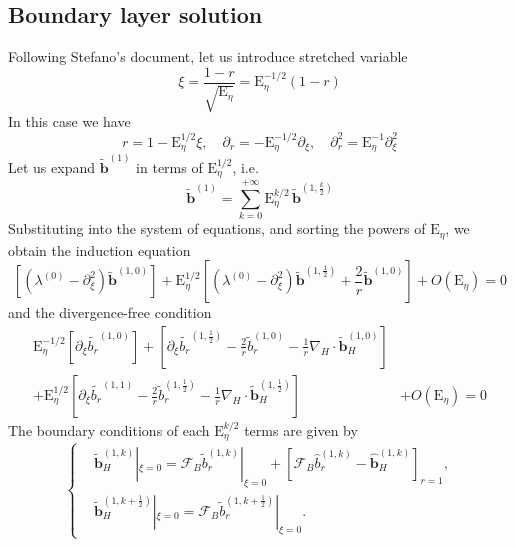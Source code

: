 \subsection{Boundary layer solution}

Following Stefano's document, let us introduce stretched variable
%
\begin{equation}
    \xi = \frac{1 - r}{\sqrt{\mathrm{E}_\eta}} = \mathrm{E}_\eta^{-1/2} (1 - r)
\end{equation}
%
In this case we have
%
\[
    r = 1 - \mathrm{E}_\eta^{1/2} \xi,\quad 
    \partial_r = - \mathrm{E}_\eta^{-1/2} \partial_\xi,\quad 
    \partial_r^2 = \mathrm{E}_\eta^{-1} \partial_\xi^2
\]
%
Let us expand $\widetilde{\mathbf{b}}^{(1)}$ in terms of $\mathrm{E}_\eta^{1/2}$, i.e. 
%
\begin{equation}
    \widetilde{\mathbf{b}}^{(1)} = \sum_{k=0}^{+\infty} \mathrm{E}_\eta^{k/2} \, \widetilde{\mathbf{b}}^{\left(1,\frac{k}{2}\right)}
\end{equation}
%
Substituting into the system of equations, and sorting the powers of $\mathrm{E}_\eta$, we obtain the induction equation
%
\begin{equation}
    \left[\left(\lambda^{(0)} - \partial_\xi^2\right) \widetilde{\mathbf{b}}^{(1,0)}\right] + \mathrm{E}_\eta^{1/2} \left[\left(\lambda^{(0)} - \partial_\xi^2\right) \widetilde{\mathbf{b}}^{(1,\frac{1}{2})} + \frac{2}{r} \widetilde{\mathbf{b}}^{(1,0)}\right] + O(\mathrm{E}_\eta) = 0
\end{equation}
%
and the divergence-free condition
%
\begin{align}
    \mathrm{E}_\eta^{-1/2} \left[\partial_\xi \widetilde{b_r}^{(1,0)}\right] + \left[\partial_\xi \widetilde{b_r}^{(1,\frac{1}{2})} - \frac{2}{r} \widetilde{b}_r^{(1,0)} - \frac{1}{r} \nabla_H\cdot \widetilde{\mathbf{b}}_H^{(1,0)}\right] & \\
    + \mathrm{E}_\eta^{1/2} \left[\partial_\xi \widetilde{b_r}^{(1,1)} - \frac{2}{r} \widetilde{b}_r^{(1,\frac{1}{2})} - \frac{1}{r} \nabla_H\cdot \widetilde{\mathbf{b}}_H^{(1,\frac{1}{2})}\right]& + O(\mathrm{E}_\eta) = 0
\end{align}
%
The boundary conditions of each $\mathrm{E}_\eta^{k/2}$ terms are given by
%
\begin{equation}
\left\{\begin{aligned}
        &\widetilde{\mathbf{b}}_H^{(1,k)}|_{\xi=0} = \mathcal{F}_B \widetilde{b}_r^{(1,k)}|_{\xi=0} + \left[\mathcal{F}_B \widehat{b}_r^{(1,k)} - \widehat{\mathbf{b}}_H^{(1,k)}\right]_{r=1}, \\ 
        &\widetilde{\mathbf{b}}_H^{(1,k+\frac{1}{2})}|_{\xi=0} = \mathcal{F}_B \widetilde{b}_r^{(1,k+\frac{1}{2})}|_{\xi=0}.
\end{aligned}\right.
\end{equation}
